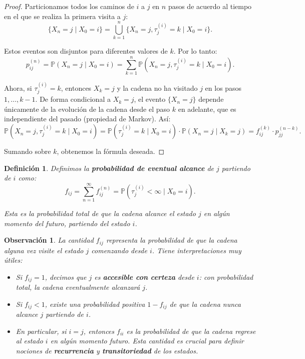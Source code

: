 \documentclass[12pt]{book}
\newtheorem{definition}{Definición}[chapter]
\newtheorem{remark}{Observación}[chapter]
\begin{document}
\begin{proof}
Particionamos todos los caminos de $i$ a $j$ en $n$ pasos de acuerdo al tiempo en el que se realiza la primera visita a $j$:
\[
\{X_n = j \mid X_0 = i\} = \bigcup_{k=1}^{n} \{X_n = j, \tau_j^{(i)} = k \mid X_0 = i\}.
\]

Estos eventos son disjuntos para diferentes valores de $k$. Por lo tanto:
\[
p_{ij}^{(n)} = \mathbb{P}(X_n = j \mid X_0 = i) = \sum_{k=1}^{n} \mathbb{P}(X_n = j, \tau_j^{(i)} = k \mid X_0 = i).
\]

Ahora, si $\tau_j^{(i)} = k$, entonces $X_k = j$ y la cadena no ha visitado $j$ en los pasos $1, \ldots, k-1$. De forma condicional a $X_k = j$, el evento $\{X_n = j\}$ depende únicamente de la evolución de la cadena desde el paso $k$ en adelante, que es independiente del pasado (propiedad de Markov). Así:
\[
\mathbb{P}(X_n = j, \tau_j^{(i)} = k \mid X_0 = i) = \mathbb{P}(\tau_j^{(i)} = k \mid X_0 = i) \cdot \mathbb{P}(X_n = j \mid X_k = j) = f_{ij}^{(k)} \cdot p_{jj}^{(n-k)}.
\]

Sumando sobre $k$, obtenemos la fórmula deseada.
\end{proof}

\begin{definition}
Definimos la \textbf{probabilidad de eventual alcance} de $j$ partiendo de $i$ como:
\[
f_{ij} = \sum_{n=1}^{\infty} f_{ij}^{(n)} = \mathbb{P}(\tau_j^{(i)} < \infty \mid X_0 = i).
\]

Esta es la probabilidad total de que la cadena alcance el estado $j$ en algún momento del futuro, partiendo del estado $i$.
\end{definition}

\begin{remark}
La cantidad $f_{ij}$ representa la probabilidad de que la cadena alguna vez visite el estado $j$ comenzando desde $i$. Tiene interpretaciones muy útiles:
\begin{itemize}
    \item Si $f_{ij} = 1$, decimos que $j$ es \textbf{accesible con certeza} desde $i$: con probabilidad total, la cadena eventualmente alcanzará $j$.
    \item Si $f_{ij} < 1$, existe una probabilidad positiva $1 - f_{ij}$ de que la cadena nunca alcance $j$ partiendo de $i$.
    \item En particular, si $i = j$, entonces $f_{ii}$ es la probabilidad de que la cadena regrese al estado $i$ en algún momento futuro. Esta cantidad es crucial para definir nociones de \textbf{recurrencia} y \textbf{transitoriedad} de los estados.
\end{itemize}
\end{remark}
\end{document}
